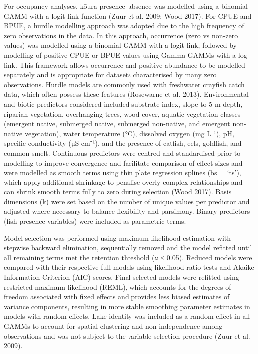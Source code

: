 \documentclass[
  12pt,
  a4paper,
]{scrbook}
\begin{document}
For occupancy analyses, kōura presence--absence was modelled using a
binomial GAMM with a logit link function (Zuur et al. 2009; Wood 2017).
For CPUE and BPUE, a hurdle modelling approach was adopted due to the
high frequency of zero observations in the data. In this approach,
occurrence (zero vs non-zero values) was modelled using a binomial GAMM
with a logit link, followed by modelling of positive CPUE or BPUE values
using Gamma GAMMs with a log link. This framework allows occurrence and
positive abundance to be modelled separately and is appropriate for
datasets characterised by many zero observations. Hurdle models are
commonly used with freshwater crayfish catch data, which often possess
these features (Rosewarne et al. 2013). Environmental and biotic
predictors considered included substrate index, slope to 5 m depth,
riparian vegetation, overhanging trees, wood cover, aquatic vegetation
classes (emergent native, submerged native, submerged non-native, and
emergent non-native vegetation), water temperature (°C), dissolved
oxygen (mg L⁻¹), pH, specific conductivity (µS cm⁻¹), and the presence
of catfish, eels, goldfish, and common smelt. Continuous predictors were
centred and standardised prior to modelling to improve convergence and
facilitate comparison of effect sizes and were modelled as smooth terms
using thin plate regression splines (bs = `ts'), which apply additional
shrinkage to penalise overly complex relationships and can shrink smooth
terms fully to zero during selection (Wood 2017). Basis dimensions (k)
were set based on the number of unique values per predictor and adjusted
where necessary to balance flexibility and parsimony. Binary predictors
(fish presence variables) were included as parametric terms.

Model selection was performed using maximum likelihood estimation with
stepwise backward elimination, sequentially removed and the model
refitted until all remaining terms met the retention threshold (\emph{α}
≤ 0.05). Reduced models were compared with their respective full models
using likelihood ratio tests and Akaike Information Criterion (AIC)
scores. Final selected models were refitted using restricted maximum
likelihood (REML), which accounts for the degrees of freedom associated
with fixed effects and provides less biased estimates of variance
components, resulting in more stable smoothing parameter estimates in
models with random effects. Lake identity was included as a random
effect in all GAMMs to account for spatial clustering and
non-independence among observations and was not subject to the variable
selection procedure (Zuur et al. 2009).
\end{document}
